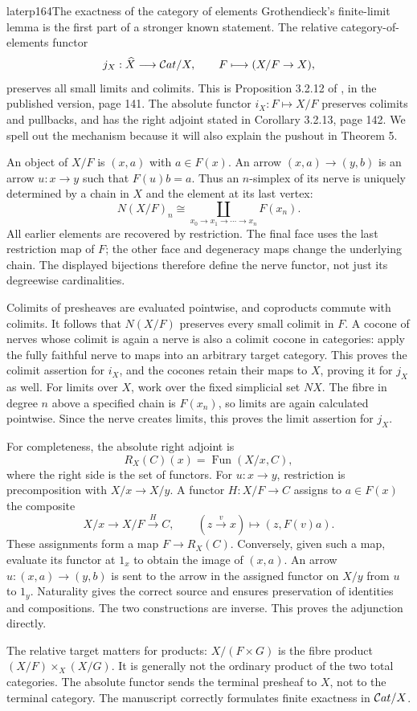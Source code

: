 \begin{dcomment}{later}{p164}{The exactness of the category of elements}
Grothendieck's finite-limit lemma is the first part of a stronger known statement. The relative category-of-elements functor
\[
             j_X:\widehat X\longrightarrow\mathcal{C}at/X,
             \qquad F\longmapsto (X/F\to X),
\]
preserves all small limits and colimits. This is Proposition 3.2.12 of \citet{Cisinski2006}, in the published version, page 141. The absolute functor $i_X:F\mapsto X/F$ preserves colimits and pullbacks, and has the right adjoint stated in Corollary 3.2.13, page 142. We spell out the mechanism because it will also explain the pushout in Theorem 5.

An object of $X/F$ is $(x,a)$ with $a\in F(x)$. An arrow $(x,a)\to(y,b)$ is an arrow $u:x\to y$ such that $F(u)b=a$. Thus an $n$-simplex of its nerve is uniquely determined by a chain in $X$ and the element at its last vertex:
\[
 N(X/F)_n\cong
       \coprod_{x_0\to x_1\to\cdots\to x_n} F(x_n).
\]
All earlier elements are recovered by restriction. The final face uses the last restriction map of $F$; the other face and degeneracy maps change the underlying chain. The displayed bijections therefore define the nerve functor, not just its degreewise cardinalities.

Colimits of presheaves are evaluated pointwise, and coproducts commute with colimits. It follows that $N(X/F)$ preserves every small colimit in $F$. A cocone of nerves whose colimit is again a nerve is also a colimit cocone in categories: apply the fully faithful nerve to maps into an arbitrary target category. This proves the colimit assertion for $i_X$, and the cocones retain their maps to $X$, proving it for $j_X$ as well. For limits over $X$, work over the fixed simplicial set $NX$. The fibre in degree $n$ above a specified chain is $F(x_n)$, so limits are again calculated pointwise. Since the nerve creates limits, this proves the limit assertion for $j_X$.

For completeness, the absolute right adjoint is
\[
       R_X(C)(x)=\operatorname{Fun}(X/x,C),
\]
where the right side is the set of functors. For $u:x\to y$, restriction is precomposition with $X/x\to X/y$. A functor $H:X/F\to C$ assigns to $a\in F(x)$ the composite
\[
 X/x\longrightarrow X/F\xrightarrow{H}C,
 \qquad (z\xrightarrow{v}x)\longmapsto(z,F(v)a).
\]
These assignments form a map $F\to R_X(C)$. Conversely, given such a map, evaluate its functor at $1_x$ to obtain the image of $(x,a)$. An arrow $u:(x,a)\to(y,b)$ is sent to the arrow in the assigned functor on $X/y$ from $u$ to $1_y$. Naturality gives the correct source and ensures preservation of identities and compositions. The two constructions are inverse. This proves the adjunction directly.

The relative target matters for products: $X/(F\times G)$ is the fibre product $(X/F)\times_X(X/G)$. It is generally not the ordinary product of the two total categories. The absolute functor sends the terminal presheaf to $X$, not to the terminal category. The manuscript correctly formulates finite exactness in $\mathcal{C}at/X$.
\end{dcomment}


